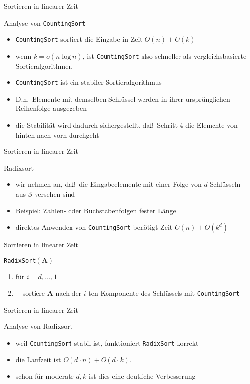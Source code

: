 \documentclass[aspectratio=1610, 11pt]{beamer}
\renewcommand{\vec}[1]{\boldsymbol{#1}}
\newcommand\cS{\mathcal S}
\newcommand\vA{\vec A}
\begin{document}
\begin{frame}{Sortieren in linearer Zeit}
	\begin{exampleblock}{Analyse von {\tt CountingSort}}
		\begin{itemize}
			\item {\tt CountingSort} sortiert die Eingabe in Zeit $O(n)+O(k)$
			\item wenn $k=o(n\log n)$, ist {\tt CountingSort} also schneller als vergleichsbasierte Sortieralgorithmen
			\item {\tt CountingSort} ist ein \alert{stabiler} Sortieralgorithmus
			\item D.h.\ Elemente mit demselben Schl\"ussel werden in ihrer urspr\"unglichen Reihenfolge ausgegeben
			\item die Stabilit\"at wird dadurch sichergestellt, da\ss\ Schritt 4 die Elemente von hinten nach vorn durchgeht
		\end{itemize}
	\end{exampleblock}
\end{frame}

\begin{frame}{Sortieren in linearer Zeit}
	\begin{exampleblock}{Radixsort}
		\begin{itemize}
			\item wir nehmen an, da\ss\ die Eingabeelemente mit einer Folge von $d$ Schl\"usseln aus $\cS$ versehen sind
			\item \alert{Beispiel:} Zahlen- oder Buchstabenfolgen fester L\"ange
			\item direktes Anwenden von {\tt CountingSort} ben\"otigt Zeit $O(n)+O(k^d)$
		\end{itemize}
	\end{exampleblock}
\end{frame}

\begin{frame}{Sortieren in linearer Zeit}
	\begin{exampleblock}{\tt RadixSort$(\vA)$}
		\begin{enumerate}
		\item f\"ur $i=d,\ldots,1$
		\item $\quad$sortiere $\vA$ nach der $i$-ten Komponente des Schl\"ussels mit {\tt CountingSort}
		\end{enumerate}
	\end{exampleblock}
\end{frame}

\begin{frame}{Sortieren in linearer Zeit}
	\begin{exampleblock}{Analyse von Radixsort}
		\begin{itemize}
			\item weil {\tt CountingSort} stabil ist, funktioniert {\tt RadixSort} korrekt
			\item die Laufzeit ist $O(d \cdot n)+O(d \cdot k)$.
			\item schon f\"ur moderate $d,k$ ist dies eine deutliche Verbesserung
		\end{itemize}
	\end{exampleblock}
\end{frame}
\end{document}
